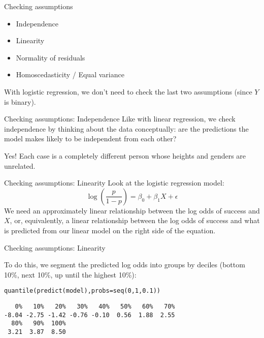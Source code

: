\documentclass{beamer}\usepackage[]{graphicx}\usepackage[]{color}
\makeatletter
\newcommand{\hlnum}[1]{\textcolor[rgb]{0.824,0.412,0.118}{#1}}%
\newcommand{\hlstd}[1]{\textcolor[rgb]{1,0.894,0.769}{#1}}%
\newcommand{\hlkwc}[1]{\textcolor[rgb]{0.78,0.941,0.545}{#1}}%
\newcommand{\hlkwd}[1]{\textcolor[rgb]{1,0.78,0.769}{#1}}%
\newenvironment{kframe}{%
 \def\at@end@of@kframe{}%
 \ifinner\ifhmode%
  \def\at@end@of@kframe{\end{minipage}}%
  \begin{minipage}{\columnwidth}%
 \fi\fi%
 \def\FrameCommand##1{\hskip\@totalleftmargin \hskip-\fboxsep
 \colorbox{shadecolor}{##1}\hskip-\fboxsep
     \hskip-\linewidth \hskip-\@totalleftmargin \hskip\columnwidth}%
 \MakeFramed {\advance\hsize-\width
   \@totalleftmargin\z@ \linewidth\hsize
   \@setminipage}}%
 {\par\unskip\endMakeFramed%
 \at@end@of@kframe}
\newenvironment{knitrout}{}{} %
\makeatother
\begin{document}
\begin{darkframes}
    \begin{frame}{Checking assumptions}
      \begin{itemize}
        \item Independence
        \item Linearity
        \item Normality of residuals \redx
        \item Homoscedasticity / Equal variance \redx
      \end{itemize}
      With logistic regression, we don't need to check the last two assumptions (since $Y$ is binary).
    \end{frame}

    \begin{frame}{Checking assumptions: Independence}
      Like with linear regression, we check independence by thinking about the data conceptually: are the predictions the model makes likely to be independent from each other?
      \bigskip\pause

      \greencheckmark \alert{Yes!} Each case is a completely different person whose heights and genders are unrelated.
    \end{frame}

    \begin{frame}{Checking assumptions: Linearity}
      Look at the logistic regression model:
      \[
        \log\left(\frac{p}{1-p}\right) = \beta_0 + \beta_1 X + \epsilon
      \]
      We need an approximately linear relationship between the \alert{log odds of success} and $X$, or, equivalently, a linear relationship between the log odds of success and what is predicted from our linear model on the right side of the equation.
    \end{frame}

    \begin{frame}[fragile]{Checking assumptions: Linearity}
      

      To do this, we segment the predicted log odds into groups by deciles (bottom 10\%, next 10\%, up until the highest 10\%):

\begin{knitrout}
\color{fgcolor}\begin{kframe}
\begin{alltt}
\hlkwd{quantile}\hlstd{(}\hlkwd{predict}\hlstd{(model),} \hlkwc{probs}\hlstd{=}\hlkwd{seq}\hlstd{(}\hlnum{0}\hlstd{,} \hlnum{1}\hlstd{,} \hlnum{0.1}\hlstd{))}
\end{alltt}
\begin{verbatim}
   0%   10%   20%   30%   40%   50%   60%   70% 
-8.04 -2.75 -1.42 -0.76 -0.10  0.56  1.88  2.55 
  80%   90%  100% 
 3.21  3.87  8.50 
\end{verbatim}
\end{kframe}
\end{knitrout}
    \end{frame}


\end{darkframes}
\end{document}
